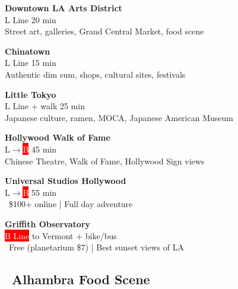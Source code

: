 \documentclass[10pt,letterpaper]{article}
\begin{document}
\begin{small}
\begin{infobox}[colback=gray!10,colframe=gray]
\textbf{Downtown LA Arts District}\\
\colorbox{yellow!80}{L Line} 20 min\\
Street art, galleries, Grand Central Market, food scene
\end{infobox}

\begin{infobox}[colback=gray!10,colframe=gray]
\textbf{Chinatown}\\
\colorbox{yellow!80}{L Line} 15 min\\
Authentic dim sum, shops, cultural sites, festivals
\end{infobox}

\begin{infobox}[colback=gray!10,colframe=gray]
\textbf{Little Tokyo}\\
\colorbox{yellow!80}{L Line} + walk 25 min\\
Japanese culture, ramen, MOCA, Japanese American Museum
\end{infobox}

\begin{infobox}[colback=gray!10,colframe=gray]
\textbf{Hollywood Walk of Fame}\\
\colorbox{yellow!80}{L}$\rightarrow$\colorbox{red}{\textcolor{white}{B}} 45 min\\
Chinese Theatre, Walk of Fame, Hollywood Sign views
\end{infobox}

\begin{infobox}[colback=gray!10,colframe=gray]
\textbf{Universal Studios Hollywood}\\
\colorbox{yellow!80}{L}$\rightarrow$\colorbox{red}{\textcolor{white}{B}} 55 min\\
\faDollarSign\ \$100+ online | Full day adventure
\end{infobox}

\begin{infobox}[colback=gray!10,colframe=gray]
\textbf{Griffith Observatory}\\
\colorbox{red}{\textcolor{white}{B Line}} to Vermont + bike/bus\\
\faDollarSign\ Free (planetarium \$7) | Best sunset views of LA
\end{infobox}
\end{small}

\subsection*{\faUtensils\ Alhambra Food Scene}
\end{document}
